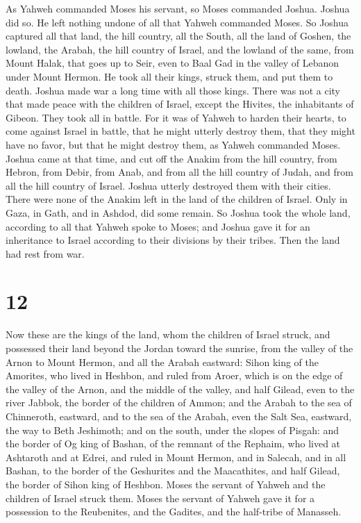  As Yahweh commanded Moses his servant, so Moses
commanded Joshua. Joshua did so. He left nothing undone of all that
Yahweh commanded Moses.  So Joshua captured all that
land, the hill country, all the South, all the land of Goshen, the
lowland, the Arabah, the hill country of Israel, and the lowland of the
same,  from Mount Halak, that goes up to Seir, even to
Baal Gad in the valley of Lebanon under Mount Hermon. He took all their
kings, struck them, and put them to death.  Joshua made
war a long time with all those kings.  There was not a
city that made peace with the children of Israel, except the Hivites,
the inhabitants of Gibeon. They took all in battle.  For
it was of Yahweh to harden their hearts, to come against Israel in
battle, that he might utterly destroy them, that they might have no
favor, but that he might destroy them, as Yahweh commanded Moses.
 Joshua came at that time, and cut off the Anakim from
the hill country, from Hebron, from Debir, from Anab, and from all the
hill country of Judah, and from all the hill country of Israel. Joshua
utterly destroyed them with their cities.  There were
none of the Anakim left in the land of the children of Israel. Only in
Gaza, in Gath, and in Ashdod, did some remain.  So Joshua
took the whole land, according to all that Yahweh spoke to Moses; and
Joshua gave it for an inheritance to Israel according to their divisions
by their tribes. Then the land had rest from war.

\hypertarget{section-11}{%
\section{12}\label{section-11}}

 Now these are the kings of the land, whom the children of
Israel struck, and possessed their land beyond the Jordan toward the
sunrise, from the valley of the Arnon to Mount Hermon, and all the
Arabah eastward:  Sihon king of the Amorites, who lived in
Heshbon, and ruled from Aroer, which is on the edge of the valley of the
Arnon, and the middle of the valley, and half Gilead, even to the river
Jabbok, the border of the children of Ammon;  and the
Arabah to the sea of Chinneroth, eastward, and to the sea of the Arabah,
even the Salt Sea, eastward, the way to Beth Jeshimoth; and on the
south, under the slopes of Pisgah:  and the border of Og
king of Bashan, of the remnant of the Rephaim, who lived at Ashtaroth
and at Edrei,  and ruled in Mount Hermon, and in Salecah,
and in all Bashan, to the border of the Geshurites and the Maacathites,
and half Gilead, the border of Sihon king of Heshbon. 
Moses the servant of Yahweh and the children of Israel struck them.
Moses the servant of Yahweh gave it for a possession to the Reubenites,
and the Gadites, and the half-tribe of Manasseh.

